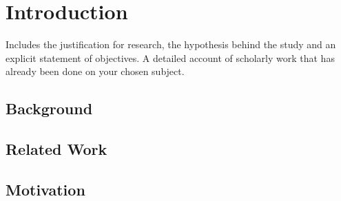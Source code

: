 
	\chapter{Introduction}
	Includes the justification for research, the hypothesis behind the 
	study and an explicit statement of objectives. 
	A detailed account of scholarly work that has already been done on 
	your chosen subject.
	\section{Background}
	\section{Related Work}
	\section{Motivation}
